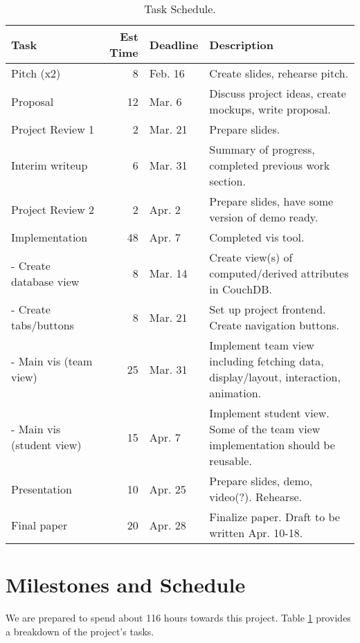 \documentclass[preprint,journal]{vgtc}       %
\begin{document}
\begin{table}[!htbp]
  \caption{Task Schedule.}
  \label{tab:schedule}
  \centering
  \begin{tabular*}{\textwidth}{lrll}%
    \hline
    \textbf{Task} & \textbf{Est Time} & \textbf{Deadline} & \textbf{Description} \\
    \hline
    Pitch (x2)                       &  8 & Feb. 16  & Create slides, rehearse pitch. \\
    Proposal                         & 12 & Mar. 6   & Discuss project ideas, create mockups, write proposal. \\
    Project Review 1                 &  2 & Mar. 21  & Prepare slides. \\
    Interim writeup                  &  6 & Mar. 31  & Summary of progress, completed previous work section. \\
    Project Review 2                 &  2 & Apr. 2   & Prepare slides, have some version of demo ready. \\
    Implementation                   & 48 & Apr. 7   & Completed vis tool. \\
     - Create database view          &  8 & Mar. 14  & Create view(s) of computed/derived attributes in CouchDB. \\
     - Create tabs/buttons           &  8 & Mar. 21  & Set up project frontend. Create navigation buttons. \\
     - Main vis (team view)          & 25 & Mar. 31  & Implement team view including fetching data, display/layout,  interaction, animation. \\
     - Main vis (student view)       & 15 & Apr. 7   & Implement student view. Some of the team view implementation should be reusable. \\
    Presentation                     & 10 & Apr. 25  & Prepare slides, demo, video(?). Rehearse. \\
    Final paper                      & 20 & Apr. 28  & Finalize paper. Draft to be written Apr. 10-18. \\
    \hline
  \end{tabular*}
\end{table}

\section{Milestones and Schedule}
We are prepared to spend about 116 hours towards this project. Table \ref{tab:schedule} provides
a breakdown of the project's tasks.
\end{document}
